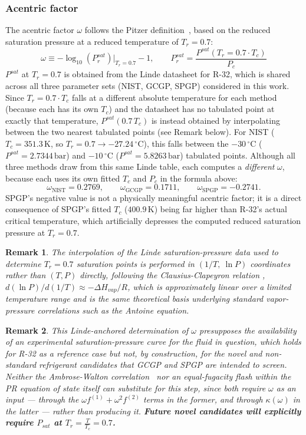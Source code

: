 \documentclass{article}
\newtheorem{remark}{Remark}
\begin{document}
\subsubsection{Acentric factor}\label{sec:acentric_factor}
The acentric factor $\omega$ follows the Pitzer definition~\cite{reid1987}, based on the reduced saturation pressure at a reduced temperature of $T_r=0.7$:
\begin{equation}
    \omega \equiv -\log_{10}\left(P_r^{sat}\right)\Big|_{T_r=0.7} - 1, \qquad P_r^{sat} = \frac{P^{sat}(T_r=0.7 \cdot T_c)}{P_c}
\end{equation}
$P^{sat}$ at $T_r=0.7$ is obtained from the Linde datasheet for R-32, which is shared across all three parameter sets (NIST, GCGP, SPGP) considered in this work. Since $T_r=0.7\cdot T_c$ falls at a different absolute temperature for each method (because each has its own $T_c$) and the datasheet has no tabulated point at exactly that temperature, $P^{sat}(0.7\,T_c)$ is instead obtained by interpolating between the two nearest tabulated points (see Remark below). For NIST ($T_c=351.3\,\text{K}$, so $T_r=0.7\to-27.24\,^\circ\text{C}$), this falls between the $-30\,^\circ\text{C}$ ($P^{sat}=2.7344\,\text{bar}$) and $-10\,^\circ\text{C}$ ($P^{sat}=5.8263\,\text{bar}$) tabulated points. Although all three methods draw from this same Linde table, each computes a \emph{different} $\omega$, because each uses its own fitted $T_c$ and $P_c$ in the formula above:
\[
\omega_{\text{NIST}} = 0.2769, \qquad \omega_{\text{GCGP}} = 0.1711, \qquad \omega_{\text{SPGP}} = -0.2741.
\]
SPGP's negative value is not a physically meaningful acentric factor; it is a direct consequence of SPGP's fitted $T_c$ ($400.9\,\text{K}$) being far higher than R-32's actual critical temperature, which artificially depresses the computed reduced saturation pressure at $T_r=0.7$.
\begin{remark}
The interpolation of the Linde saturation-pressure data used to determine
$T_r=0.7$ saturation points is performed in $(1/T,\ \ln P)$ coordinates
rather than $(T,P)$ directly, following the Clausius-Clapeyron relation
\cite[sec.\ 7-2]{poling2001}, $d(\ln P)/d(1/T) \approx -\Delta H_{vap}/R$,
which is approximately linear over a limited temperature range and is the
same theoretical basis underlying standard vapor-pressure correlations
such as the Antoine equation.
\end{remark}
\begin{remark}
This Linde-anchored determination of $\omega$ presupposes the availability
of an experimental saturation-pressure curve for the fluid in question,
which holds for R-32 as a reference case but not, by construction, for the
novel and non-standard refrigerant candidates that GCGP and SPGP are
intended to screen. Neither the Ambrose-Walton correlation~\cite{ambrosewalton1989}
nor an equal-fugacity flash within the PR equation of state itself can
substitute for this step, since both require $\omega$ as an input --- through
the $\omega f^{(1)} + \omega^2 f^{(2)}$ terms in the former, and through $\kappa(\omega)$
in the latter --- rather than producing it. \textbf{Future novel candidates will explicitly require $P_{sat}$ at $T_r = \frac{T}{T_c} = 0.7$.}
\end{remark}
\end{document}
